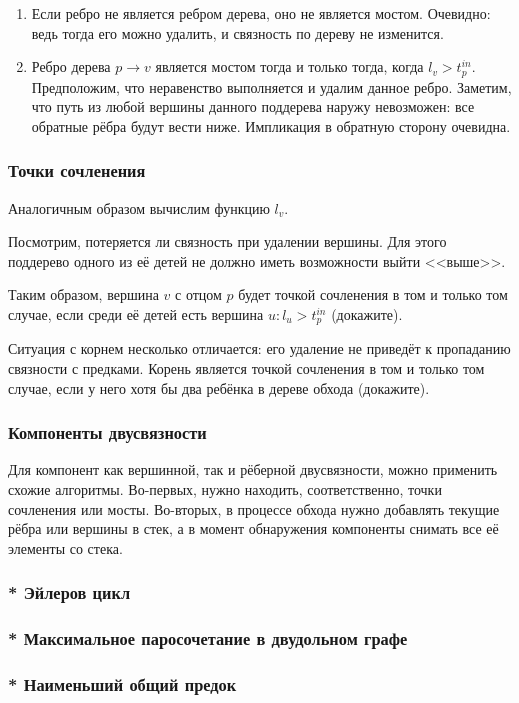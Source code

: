 \documentclass[a4paper,12pt]{article}
\begin{document}
      \begin{enumerate}
        \item Если ребро не является ребром дерева, оно не является
          мостом. Очевидно: ведь тогда его можно удалить, и связность
          по дереву не изменится.
        \item Ребро дерева $p \to v$ является мостом тогда и только
          тогда, когда $l_v > t^{in}_p$. Предположим, что неравенство
          выполняется и удалим данное ребро. Заметим, что путь из
          любой вершины данного поддерева наружу невозможен: все
          обратные рёбра будут вести ниже. Импликация в обратную
          сторону очевидна.
      \end{enumerate}

      \subsubsection{Точки сочленения}

      Аналогичным образом вычислим функцию $l_v$.

      Посмотрим, потеряется ли связность при удалении вершины. Для этого
      поддерево одного из её детей не должно иметь возможности выйти
      <<выше>>.

      Таким образом, вершина $v$ с отцом $p$ будет точкой сочленения
      в том и только том случае, если среди её детей есть вершина
      $u: l_u > t^{in}_p$ (докажите).

      Ситуация с корнем несколько отличается: его удаление не приведёт
      к пропаданию связности с предками. Корень является точкой сочленения
      в том и только том случае, если у него хотя бы два ребёнка в дереве
      обхода (докажите).

      \subsubsection{Компоненты двусвязности}

      Для компонент как вершинной, так и рёберной двусвязности, можно
      применить схожие алгоритмы. Во-первых, нужно находить, соответственно,
      точки сочленения или мосты. Во-вторых, в процессе обхода нужно
      добавлять текущие рёбра или вершины в стек, а в момент обнаружения
      компоненты снимать все её элементы со стека.

      \subsubsection{* Эйлеров цикл}

      \subsubsection{* Максимальное паросочетание в двудольном графе}

      \subsubsection{* Наименьший общий предок}
\end{document}
